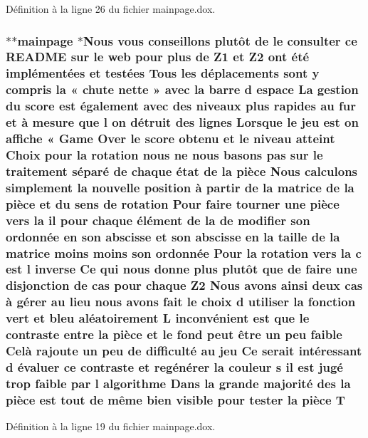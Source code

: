 Définition à la ligne 26 du fichier mainpage.\-dox.

\hypertarget{mainpage_8dox_a71ef61e8a878d267945d3d068101c6cb}{
\subsubsection[{T}]{\setlength{\rightskip}{0pt plus 5cm}$\ast$$\ast$mainpage $\ast$Nous vous conseillons plutô{\bf t} {\bf de} le consulter ce R\-E\-A\-D\-M\-E sur le web pour plus {\bf de} {\bf Z1} et Z2 ont é{\bf t}é implémentées et testées Tous les déplacements sont {\bf y} compris la « chute nette » avec la barre d espace La gestion du score est également avec des niveaux plus rapides au fur et à mesure que l on détruit des lignes Lorsque le jeu est on affiche « Game Over le score obtenu et le niveau atteint Choix pour la rotation nous ne nous basons pas sur le traitement {\bf s}éparé {\bf de} chaque état {\bf de} la pièce Nous calculons simplement la nouvelle position à partir {\bf de} la {\bf matrice} {\bf de} la pièce et du {\bf sens} {\bf de} rotation Pour faire tourner une pièce vers la il pour chaque élément {\bf de} la {\bf de} modifier son ordonnée en son abscisse et son abscisse en la taille {\bf de} la {\bf matrice} moins moins son ordonnée Pour la rotation vers la {\bf c} est l inverse Ce qui nous donne plus plutô{\bf t} que {\bf de} faire une disjonction {\bf de} {\bf cas} pour chaque Z2 Nous avons ainsi deux {\bf cas} à {\bf g}érer au lieu nous avons fait le choix d utiliser la fonction vert et bleu aléatoirement L inconvénient est que le contraste entre la pièce et le fond peut être un peu faible Celà rajoute un peu {\bf de} difficulté au jeu Ce serait intéressant d évaluer ce contraste et regé{\bf n}érer la couleur {\bf s} il est jugé trop faible par l algorithme Dans la grande majorité des la pièce est tout {\bf de} {\bf m}ême bien visible pour tester la pièce T}}\label{mainpage_8dox_a71ef61e8a878d267945d3d068101c6cb}


Définition à la ligne 19 du fichier mainpage.\-dox.

